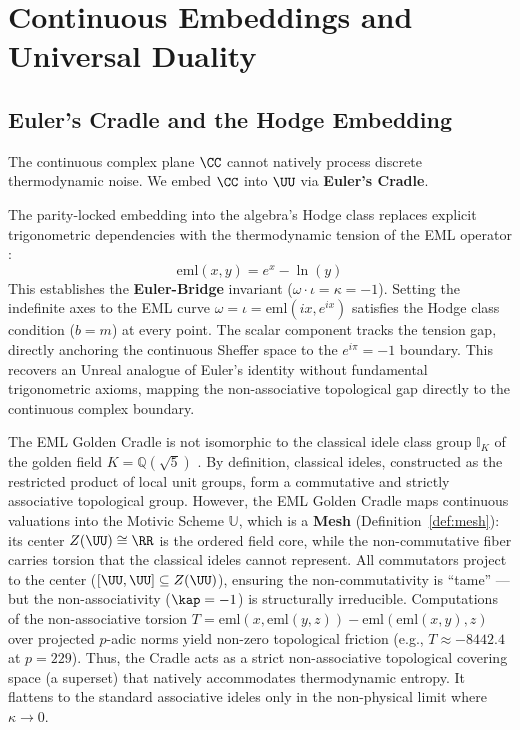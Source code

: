 \section{Continuous Embeddings and Universal Duality}

\subsection{Euler's Cradle and the Hodge Embedding}

The continuous complex plane $\CC$ cannot natively process discrete thermodynamic noise. We embed $\CC$ into $\UU$ via \textbf{Euler's Cradle}.

\begin{definition}\label{def:euler-cradle}
The parity-locked embedding into the algebra's Hodge class replaces explicit trigonometric dependencies with the thermodynamic tension of the EML operator \cite{odrzywolek}:
$$\mathrm{eml}(x,y) = e^x - \ln(y)$$
This establishes the \textbf{Euler-Bridge} invariant ($\omega \cdot \iota = \kappa = -1$). Setting the indefinite axes to the EML curve $\omega = \iota = \mathrm{eml}(i x, e^{ix})$ satisfies the Hodge class condition ($b = m$) at every point. The scalar component tracks the tension gap, directly anchoring the continuous Sheffer space to the $e^{i\pi} = -1$ boundary. This recovers an Unreal analogue of Euler's identity without fundamental trigonometric axioms, mapping the non-associative topological gap directly to the continuous complex boundary.
\end{definition}

\begin{theorem}\label{thm:idele-superset}
The EML Golden Cradle is not isomorphic to the classical idele class group $\mathbb{I}_K$ of the golden field $K = \mathbb{Q}(\sqrt{5})$ \cite{chevalley1936}. By definition, classical ideles, constructed as the restricted product of local unit groups, form a commutative and strictly associative topological group. However, the EML Golden Cradle maps continuous valuations into the Motivic Scheme $\mathbb{U}$, which is a \textbf{Mesh} (Definition~\ref{def:mesh}): its center $Z(\UU) \cong \RR$ is the ordered field core, while the non-commutative fiber carries torsion that the classical ideles cannot represent. All commutators project to the center ($[\UU, \UU] \subseteq Z(\UU)$), ensuring the non-commutativity is ``tame'' --- but the non-associativity ($\kap = -1$) is structurally irreducible. Computations of the non-associative torsion $T = \mathrm{eml}(x, \mathrm{eml}(y, z)) - \mathrm{eml}(\mathrm{eml}(x, y), z)$ over projected $p$-adic norms yield non-zero topological friction (e.g., $T \approx -8442.4$ at $p = 229$). Thus, the Cradle acts as a strict non-associative topological covering space (a superset) that natively accommodates thermodynamic entropy. It flattens to the standard associative ideles only in the non-physical limit where $\kappa \to 0$.
\end{theorem}

